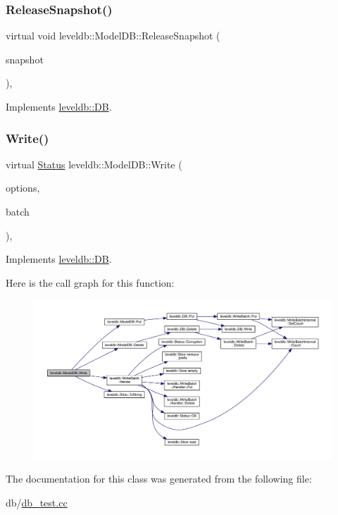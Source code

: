 \subsubsection{\texorpdfstring{ReleaseSnapshot()}{ReleaseSnapshot()}}
{\footnotesize\ttfamily virtual void leveldb\+::\+Model\+D\+B\+::\+Release\+Snapshot (\begin{DoxyParamCaption}\item[{const \mbox{\hyperlink{classleveldb_1_1_snapshot}{Snapshot}} $\ast$}]{snapshot }\end{DoxyParamCaption})\hspace{0.3cm}{\ttfamily [inline]}, {\ttfamily [virtual]}}



Implements \mbox{\hyperlink{classleveldb_1_1_d_b_aa46de65e990bd179db0aee770af89144}{leveldb\+::\+DB}}.

\mbox{\label{classleveldb_1_1_model_d_b_ae3a20d2fc971376349b142b9c2d159be}} 
\subsubsection{\texorpdfstring{Write()}{Write()}}
{\footnotesize\ttfamily virtual \mbox{\hyperlink{classleveldb_1_1_status}{Status}} leveldb\+::\+Model\+D\+B\+::\+Write (\begin{DoxyParamCaption}\item[{const \mbox{\hyperlink{structleveldb_1_1_write_options}{Write\+Options}} \&}]{options,  }\item[{\mbox{\hyperlink{classleveldb_1_1_write_batch}{Write\+Batch}} $\ast$}]{batch }\end{DoxyParamCaption})\hspace{0.3cm}{\ttfamily [inline]}, {\ttfamily [virtual]}}



Implements \mbox{\hyperlink{classleveldb_1_1_d_b_ae0b6ded8c8e0b88ff70190bf7a0c086c}{leveldb\+::\+DB}}.

Here is the call graph for this function\+:
\nopagebreak
\begin{figure}[H]
\begin{center}
\leavevmode
\includegraphics[width=350pt]{classleveldb_1_1_model_d_b_ae3a20d2fc971376349b142b9c2d159be_cgraph}
\end{center}
\end{figure}


The documentation for this class was generated from the following file\+:\begin{DoxyCompactItemize}
\item 
db/\mbox{\hyperlink{db__test_8cc}{db\+\_\+test.\+cc}}\end{DoxyCompactItemize}
